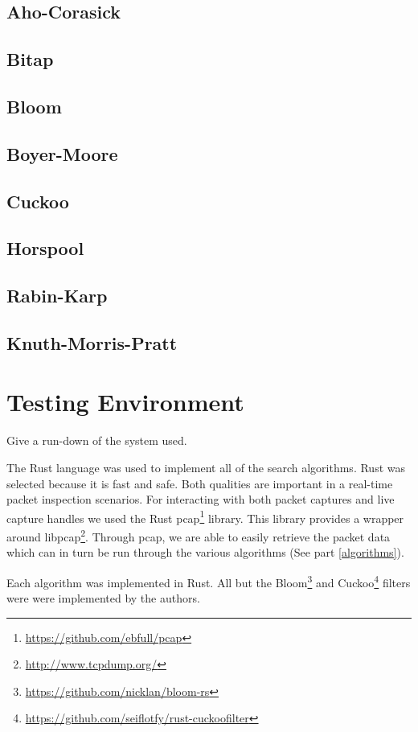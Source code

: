 \documentclass{article}
\begin{document}
\subsection{Aho-Corasick}
\cite{Aho1975}
\subsection{Bitap}
\cite{Baeza1992}
\subsection{Bloom}
\cite{Bloom1970}
\subsection{Boyer-Moore}
\cite{Boyer1977}
\subsection{Cuckoo}
\cite{Fan2014}
\subsection{Horspool}
\cite{Horspool1980}
\subsection{Rabin-Karp}
\cite{Karp1987}
\subsection{Knuth-Morris-Pratt}
\cite{Knuth1977}

\section{Testing Environment}	
Give a run-down of the system used.

The Rust language was used to implement all of the search algorithms. Rust was selected because it is fast and safe. Both  qualities are important in a real-time packet inspection scenarios. For interacting with both packet captures and live capture handles we used the Rust pcap\footnote{\url{https://github.com/ebfull/pcap}} library. This library provides a wrapper around libpcap\footnote{\url{http://www.tcpdump.org/}}. Through pcap, we are able to easily retrieve the packet data which can in turn be run through the various algorithms (See part \ref{algorithms}).

Each algorithm was implemented in Rust. All but the Bloom\footnote{\url{https://github.com/nicklan/bloom-rs}} \cite{Bloom1970} and Cuckoo\footnote{\url{https://github.com/seiflotfy/rust-cuckoofilter}} \cite{Fan2014} filters were were implemented by the authors.
\end{document}
